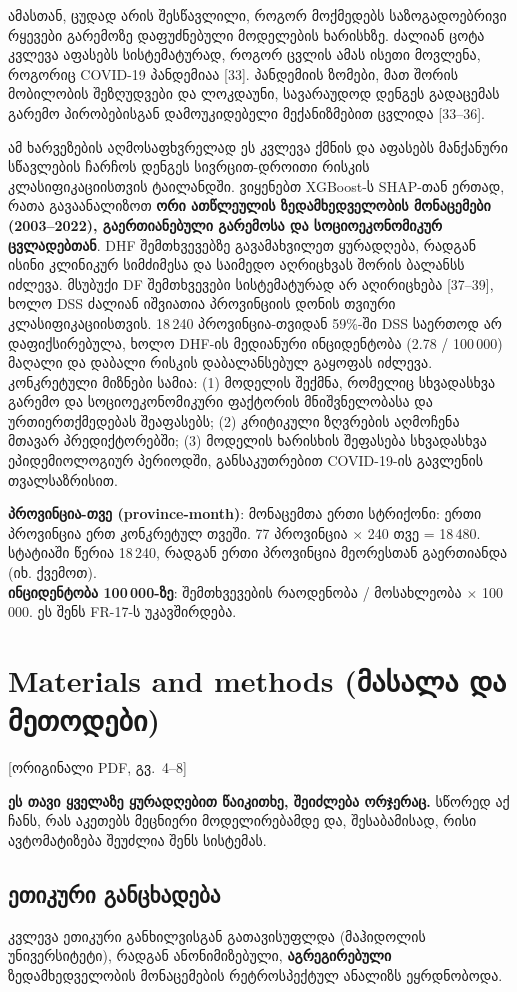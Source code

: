 \documentclass[11pt,a4paper]{article}
\newcommand{\imp}[1]{\textbf{\color{importred}#1}}
\newcommand{\pg}[1]{{\small\color{gray}[ორიგინალი PDF, გვ.~#1]}}
\begin{document}
ამასთან, ცუდად არის შესწავლილი, როგორ მოქმედებს საზოგადოებრივი რყევები გარემოზე დაფუძნებული
მოდელების ხარისხზე. ძალიან ცოტა კვლევა აფასებს სისტემატურად, როგორ ცვლის ამას ისეთი მოვლენა, როგორიც
COVID-19 პანდემიაა [33]. პანდემიის ზომები, მათ შორის მობილობის შეზღუდვები და ლოკდაუნი, სავარაუდოდ
დენგეს გადაცემას გარემო პირობებისგან დამოუკიდებელი მექანიზმებით ცვლიდა [33--36].

ამ ხარვეზების აღმოსაფხვრელად ეს კვლევა ქმნის და აფასებს მანქანური სწავლების ჩარჩოს დენგეს სივრცით-დროითი
რისკის კლასიფიკაციისთვის ტაილანდში. ვიყენებთ XGBoost-ს SHAP-თან ერთად, რათა გავაანალიზოთ \imp{ორი ათწლეულის
ზედამხედველობის მონაცემები (2003--2022), გაერთიანებული გარემოსა და სოციოეკონომიკურ ცვლადებთან}.
DHF შემთხვევებზე გავამახვილეთ ყურადღება, რადგან ისინი კლინიკურ სიმძიმესა და საიმედო აღრიცხვას შორის
ბალანსს იძლევა. მსუბუქი DF შემთხვევები სისტემატურად არ აღირიცხება [37--39], ხოლო DSS ძალიან იშვიათია
პროვინციის დონის თვიური კლასიფიკაციისთვის. 18\,240 პროვინცია-თვიდან 59\%-ში DSS საერთოდ არ
დაფიქსირებულა, ხოლო DHF-ის მედიანური ინციდენტობა (2.78 / 100\,000) მაღალი და დაბალი რისკის
დაბალანსებულ გაყოფას იძლევა. კონკრეტული მიზნები სამია:
(1) მოდელის შექმნა, რომელიც სხვადასხვა გარემო და სოციოეკონომიკური ფაქტორის მნიშვნელობასა და
ურთიერთქმედებას შეაფასებს; (2) კრიტიკული ზღვრების აღმოჩენა მთავარ პრედიქტორებში; (3) მოდელის ხარისხის
შეფასება სხვადასხვა ეპიდემიოლოგიურ პერიოდში, განსაკუთრებით COVID-19-ის გავლენის თვალსაზრისით.

\begin{termin}
\textbf{პროვინცია-თვე (province-month)}: მონაცემთა ერთი სტრიქონი: ერთი პროვინცია ერთ კონკრეტულ თვეში. 77 პროვინცია $\times$ 240 თვე = 18\,480. სტატიაში წერია 18\,240, რადგან ერთი პროვინცია მეორესთან გაერთიანდა (იხ. ქვემოთ).\\
\textbf{ინციდენტობა 100\,000-ზე}: შემთხვევების რაოდენობა / მოსახლეობა $\times$ 100\,000. ეს შენს FR-17-ს უკავშირდება.
\end{termin}

\section{Materials and methods (მასალა და მეთოდები)} \pg{4--8}

\imp{ეს თავი ყველაზე ყურადღებით წაიკითხე, შეიძლება ორჯერაც.} სწორედ აქ ჩანს, რას აკეთებს მეცნიერი
მოდელირებამდე და, შესაბამისად, რისი ავტომატიზება შეუძლია შენს სისტემას.

\subsection*{ეთიკური განცხადება}
კვლევა ეთიკური განხილვისგან გათავისუფლდა (მაჰიდოლის უნივერსიტეტი), რადგან ანონიმიზებული,
\imp{აგრეგირებული} ზედამხედველობის მონაცემების რეტროსპექტულ ანალიზს ეყრდნობოდა.
\end{document}
